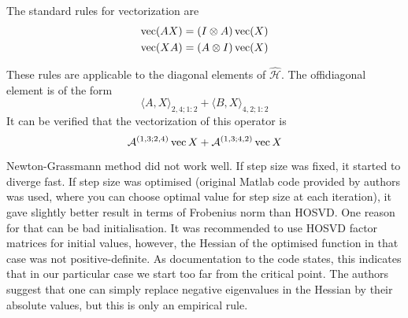 The standard rules for vectorization are
\begin{eqnarray*}
\operatorname*{vec}(AX) = (I \otimes A) \operatorname*{vec}(X) \\
\operatorname*{vec}(XA) = (A \otimes I) \operatorname*{vec}(X)
\end{eqnarray*}

These rules are applicable to the diagonal elements of $\hat{\mathcal{H}}$. The offidiagonal element
is of the form
\begin{equation}
\langle A, X \rangle _{2,4;1:2} + \langle B, X \rangle_{4,2;1:2}
\end{equation}
It can be verified that the vectorization of this operator is
\begin{equation}
\mathcal{A}^{(1,3;2,4)} \operatorname*{vec}{X} + \mathcal{A}^{(1,3;4,2)} \operatorname*{vec}{X}
\end{equation}



Newton-Grassmann method did not work well. If step size was fixed,
it started to diverge fast. If step size was optimised (original
Matlab code provided by authors was used, where you can choose
optimal value for step size at each iteration), it gave slightly
better result in terms of Frobenius norm than HOSVD. One reason
for that can be bad initialisation. It was recommended to use
HOSVD factor matrices for initial values, however, the Hessian
of the optimised function in that case was not positive-definite.
As documentation to the code states, this indicates that in our particular case we start too far from the critical point.
The authors suggest that one can simply replace negative eigenvalues
in the Hessian by their absolute values, but this is only an empirical rule.

